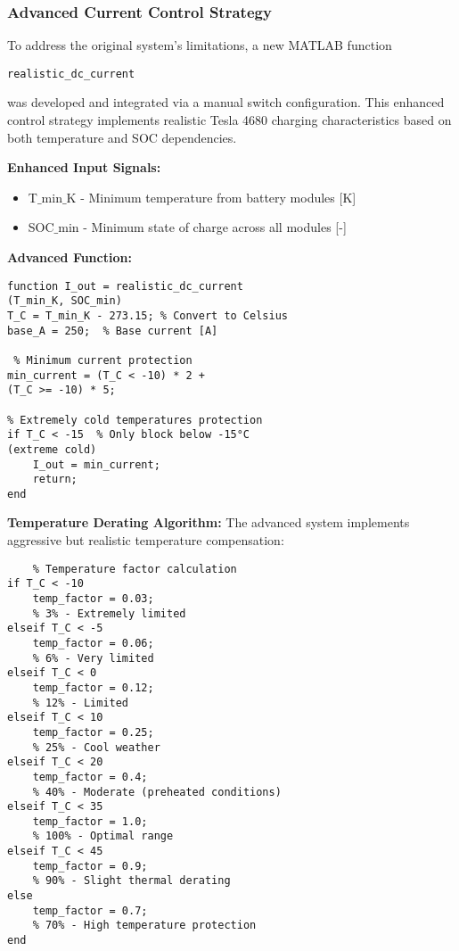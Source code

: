 \documentclass[conference]{IEEEtran}
\begin{document}
\subsubsection{\textbf{Advanced Current Control Strategy}}

To address the original system's limitations, a new MATLAB function 
\begin{verbatim}
realistic_dc_current
\end{verbatim} was developed and integrated via a manual switch configuration. This enhanced control strategy implements realistic Tesla 4680 charging characteristics based on both temperature and SOC dependencies.

\textbf{Enhanced Input Signals:}

\begin{itemize}
    \item T$\_$min$\_$K - Minimum temperature from battery modules [K]
    \item SOC$\_$min - Minimum state of charge across all modules [-] 
\end{itemize}

\textbf{Advanced Function:}

\begin{verbatim}
function I_out = realistic_dc_current 
(T_min_K, SOC_min)
T_C = T_min_K - 273.15; % Convert to Celsius
base_A = 250;  % Base current [A]

 % Minimum current protection
min_current = (T_C < -10) * 2 + 
(T_C >= -10) * 5;

% Extremely cold temperatures protection
if T_C < -15  % Only block below -15°C 
(extreme cold)
    I_out = min_current;
    return;
end

\end{verbatim}

\textbf{Temperature Derating Algorithm:} The advanced system implements aggressive but realistic temperature compensation:
\begin{verbatim}
    % Temperature factor calculation
if T_C < -10
    temp_factor = 0.03;      
    % 3% - Extremely limited
elseif T_C < -5
    temp_factor = 0.06;      
    % 6% - Very limited  
elseif T_C < 0
    temp_factor = 0.12;      
    % 12% - Limited
elseif T_C < 10
    temp_factor = 0.25;      
    % 25% - Cool weather
elseif T_C < 20
    temp_factor = 0.4;       
    % 40% - Moderate (preheated conditions)
elseif T_C < 35
    temp_factor = 1.0;       
    % 100% - Optimal range
elseif T_C < 45
    temp_factor = 0.9;       
    % 90% - Slight thermal derating
else
    temp_factor = 0.7;       
    % 70% - High temperature protection
end
\end{verbatim}
\end{document}
